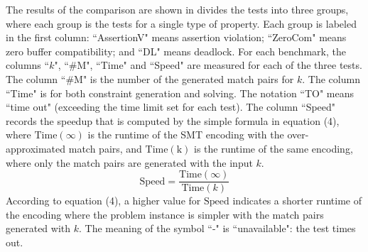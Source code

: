 The results of the comparison are shown in  divides the tests into three groups, where each group is the tests for a single type of property. Each group is labeled in the first column: ``AssertionV" means assertion violation; ``ZeroCom" means zero buffer compatibility; and ``DL" means deadlock. For each benchmark, the columns ``$k$", ``\#M", ``Time" and ``Speed" are measured for each of the three tests. The column ``\#M" is the number of the generated match pairs for $k$. The column ``Time" is for both constraint generation and solving. The notation ``TO" means ``time out" (exceeding the time limit set for each test). The column ``Speed" records the speedup that is computed by the simple formula in equation (4), where $\mathrm{Time}(\infty)$ is the runtime of the SMT encoding with the over-approximated match pairs, and $\mathrm{Time}(\mathrm{k})$ is the runtime of the same encoding, where only the match pairs are generated with the input $k$. 
\begin{equation}
\mathrm{Speed} = \frac{\mathrm{Time}(\infty)}{\mathrm{Time}(\mathit{k})}
\end{equation}
According to equation (4), a higher value for $\mathrm{Speed}$ indicates a shorter runtime of the encoding where the problem instance is simpler with the match pairs generated with $k$.
The meaning of the symbol ``-" is ``unavailable": the test times out.



